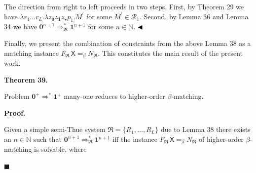  
 
The direction from right to left proceeds in two steps. First, by Theorem 29 we have $\lambda r_{1}\ldots r_{L}.\lambda z_{\mathbf{0}}z_{\mathbf{1}}z_{\star}p_{1}.M%
^{\prime}$ for some $M^{\prime}\in\mathcal{R}_{1}$. Second, by Lemma 36 and Lemma 34 we have $\mathbf{0}^{n+1}\Rightarrow_{\mathfrak{R}}^{*}\mathbf{1}^{n+1}$ for some $n\in\mathbb{N}$. $\hfill\blacktriangleleft$\par
 
 
 
Finally, we present the combination of constraints from the above Lemma 38 as a matching instance $F_{\mathfrak{R}}\,\mathsf{X}=_{\beta}N_{\mathfrak{R}}$. This constitutes the main result of the present work.\par
 
 
 
\par\medskip\noindent\textbf{Theorem 39.}\par
 
 
Problem $\mathbf{0}^{+}\Rightarrow^{*}\mathbf{1}^{+}$ many-one reduces to higher-order $\beta$-matching.\par
 
 
 
 
 
\par\medskip\noindent\textbf{Proof.}\par
 
 
Given a simple semi-Thue system $\mathfrak{R}=\{R_{1},\ldots,R_{L}\}$ due to Lemma 38 there exists an $n\in\mathbb{N}$ such that $\mathbf{0}^{n+1}\Rightarrow_{\mathfrak{R}}^{*}\mathbf{1}^{n+1}$ iff the instance $F_{\mathfrak{R}}\,\mathsf{X}=_{\beta}N_{\mathfrak{R}}$ of higher-order $\beta$-matching is solvable, where\par
  
\par\noindent  $\blacksquare$ 
 
